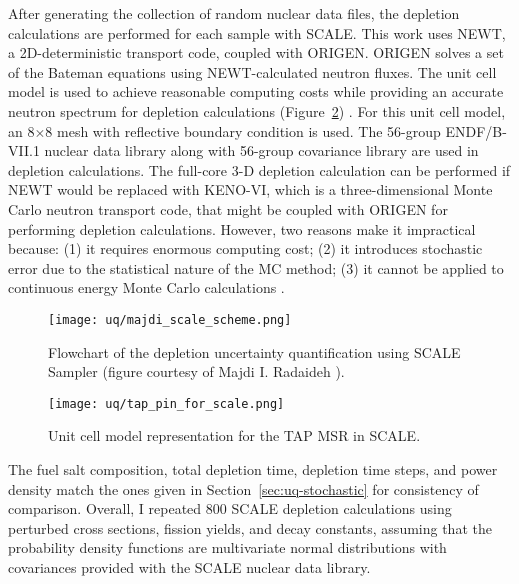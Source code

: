After generating the collection of random nuclear data files, the depletion 
calculations are performed for each sample with SCALE. This work uses NEWT, a
2D-deterministic transport code, coupled with ORIGEN. ORIGEN solves a set of 
the Bateman equations using NEWT-calculated neutron fluxes. The unit cell 
model is used to achieve reasonable computing costs while providing an 
accurate neutron spectrum for depletion calculations 
(Figure~\ref{fig:uq-tap-pincell}) \cite{betzler_molten_2017, 
rykhlevskii_fuel_2019, betzler_modeling_2020}. For this unit cell model, an 
8$\times$8 mesh with reflective boundary condition is used. The 56-group 
ENDF/B-VII.1 nuclear data library along with 56-group covariance library are 
used in depletion calculations. The full-core 3-D depletion 
calculation can be performed if NEWT would be replaced with KENO-VI, which 
is a three-dimensional Monte Carlo neutron transport code, that might be 
coupled with ORIGEN for performing depletion calculations. However, two 
reasons make it impractical because: 
(1) it requires enormous computing cost; (2) it introduces stochastic error 
due to the statistical nature of the \gls{MC} method;
(3) it cannot be applied to continuous energy Monte Carlo calculations 
\cite{rearden_scale_2018}.
\begin{figure}[htp!] %
	\centering
	\texttt{[image: uq/majdi\_scale\_scheme.png]}
	\caption{Flowchart of the depletion uncertainty quantification 
		using SCALE Sampler (figure courtesy of Majdi I. Radaideh 
		\cite{radaideh_novel_2019-1}).}
	\label{fig:uq-sampler}
\end{figure}
	\vspace{-7mm}
\begin{figure}[hbp!] %
	\centering
	\texttt{[image: uq/tap\_pin\_for\_scale.png]}
	\caption{Unit cell model representation for the \gls{TAP} \gls{MSR} in 
	SCALE.}
	\label{fig:uq-tap-pincell}
\end{figure}

The fuel salt composition, total depletion time, depletion time steps, and 
power density match the ones given in Section~\ref{sec:uq-stochastic} for 
consistency of comparison. Overall, I repeated 800 SCALE depletion 
calculations using perturbed cross sections, fission yields, and decay 
constants, assuming that the probability density functions are multivariate 
normal distributions with covariances provided with the SCALE nuclear data 
library.


